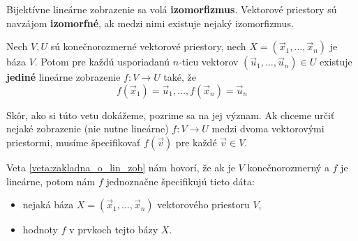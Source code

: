 \begin{definicia}[Izomorfizmus]
Bijektívne lineárne zobrazenie sa volá \textbf{izomorfizmus}. Vektorové priestory sú navzájom \textbf{izomorfné}, ak medzi nimi existuje nejaký izomorfizmus.
\end{definicia}

\begin{veta} \label{veta:zakladna_o_lin_zob}
Nech $V, U$ sú konečnorozmerné vektorové priestory, nech $X = (\vec{x}_1, \dots, \vec{x}_n)$ je báza $V$. Potom pre každú usporiadanú $n$-ticu vektorov $(\vec{u}_1, \dots, \vec{u}_n) \in U$ existuje \textbf{jediné} lineárne zobrazenie $f: V \to U$ také, že
$$ f(\vec{x}_1) = \vec{u}_1, \dots, f(\vec{x}_n) = \vec{u}_n $$
\end{veta}

Skôr, ako si túto vetu dokážeme, pozrime sa na jej význam.
Ak chceme určiť nejaké zobrazenie (nie nutne lineárne) $f: V \to U$ medzi dvoma vektorovými priestormi, musíme špecifikovať $f(\vec{v})$ pre každé $\vec{v} \in V$.

Veta \ref{veta:zakladna_o_lin_zob} nám hovorí, že ak je $V$ konečnorozmerný a $f$ je lineárne, potom nám $f$ jednoznačne špecifikujú tieto dáta:
\begin{itemize}
    \item nejaká báza $X = (\vec{x}_1, \dots, \vec{x}_n)$ vektorového priestoru $V$,
    \item hodnoty $f$ v prvkoch tejto bázy $X$.
\end{itemize}

